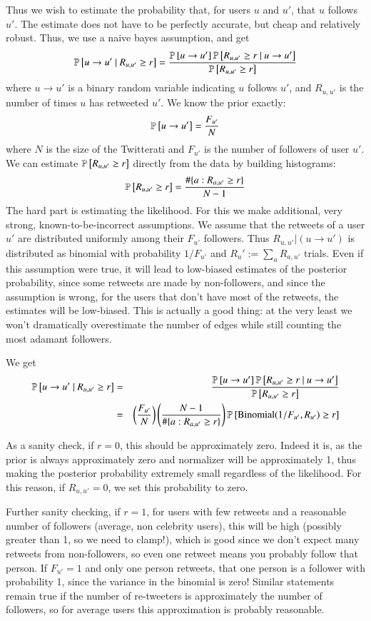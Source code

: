 Thus we wish to estimate the probability that, for users $u$ and $u'$, that $u$ follows $u'$.
The estimate does not have to be perfectly accurate, but cheap and relatively robust.  
Thus, we use a naive bayes assumption, and get
\[\mathbb{P} \left[u\to u'~|~R_{u,u'}\ge r\right] = \frac{\mathbb{P} \left[u\to u'\right]\mathbb{P} \left[R_{u,u'}\ge r~|~u\to u'\right]}{\mathbb{P} \left[R_{u,u'}\ge r\right]}\]
where $u\to u'$ is a binary random variable indicating $u$ follows $u'$, and $R_{u,u'}$ is the number of times $u$ has retweeted $u'$.  
We know the prior exactly:
\[\mathbb{P} \left[u\to u'\right]=\frac{F_{u'}}{N}\]
where $N$ is the size of the Twitterati and $F_{u'}$ is the number of followers of user $u'$.
We can estimate $\mathbb{P} \left[R_{u,u'} \ge r\right]$ directly from the data by building histograms:
\[\mathbb{P} \left[R_{u,u'} \ge r\right]=\frac{\#\{a : R_{a,u'}\ge r\}}{N-1}\]
The hard part is estimating the likelihood.  For this we make additional, very strong, known-to-be-incorrect assumptions.
We assume that the retweets of a user $u'$ are distributed uniformly among their $F_{u'}$ followers.  
Thus $R_{u,u'}|(u\to u')$ is distributed as binomial with probability $1/F_{u'}$ and $R_u':=\sum_a R_{a,u'}$ trials.  
Even if this assumption were true, it will lead to low-biased estimates of the posterior probability, since some retweets are made by non-followers, and since the assumption is wrong, for the users that don't have most of the retweets, the estimates will be low-biased.
This is actually a good thing: at the very least we won't dramatically overestimate the number of edges while still counting the most adamant followers.  

We get
\begin{eqnarray}
  \mathbb{P} \left[u\to u'~|~R_{u,u'}\ge r\right] &=& \frac{\mathbb{P} \left[u\to u'\right]\mathbb{P} \left[R_{u,u'}\ge r~|~u\to u'\right]}{\mathbb{P} \left[R_{u,u'}\ge r\right]}\nonumber\\
  &=& \left(\frac{F_{u'}}{N}\right)\left(\frac{N-1}{\#\{a : R_{a,u'}\ge r\}}\right)\mathbb{P} \left[\mbox{Binomial}(1/F_{u'},R_{u'}) \ge r\right]\label{eq:edgeprob}
\end{eqnarray}

As a sanity check, if $r=0$, this should be approximately zero.
Indeed it is, as the prior is always approximately zero and normalizer will be approximately 1, thus making the posterior probability extremely small regardless of the likelihood.  
For this reason, if $R_{u,u'}=0$, we set this probability to zero.

Further sanity checking, if $r=1$, for users with few retweets and a reasonable number of followers (average, non celebrity users), this will be high (possibly greater than 1, so we need to clamp!), which is good since we don't expect many retweets from non-followers, so even one retweet means you probably follow that person.  
If $F_{u'}=1$ and only one person retweets, that one person is a follower with probability 1, since the variance in the binomial is zero!  Similar statements remain true if the number of re-tweeters is approximately the number of followers, so for average users this approximation is probably reasonable.  

